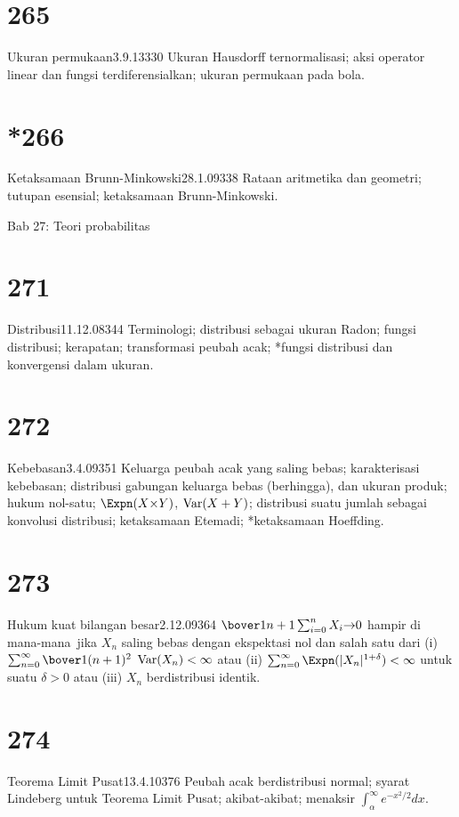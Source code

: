 \section{265}{Ukuran permukaan}{3.9.13}{330}{}
{Ukuran Hausdorff ternormalisasi; aksi operator linear dan
fungsi terdiferensialkan; ukuran permukaan pada bola.}

\section{*266}{Ketaksamaan Brunn-Minkowski}{28.1.09}{338}{}
{Rataan aritmetika dan geometri; tutupan esensial; ketaksamaan
Brunn-Minkowski.}


 Bab 27:  Teori probabilitas


\section{271}{Distribusi}{11.12.08}{344}{}
{Terminologi; distribusi sebagai ukuran Radon; fungsi distribusi;
kerapatan; transformasi peubah acak; *fungsi distribusi dan konvergensi
dalam ukuran.}

\section{272}{Kebebasan}{3.4.09}{351}{}
{Keluarga peubah acak yang saling bebas; karakterisasi
kebebasan; distribusi gabungan keluarga bebas (berhingga), dan
ukuran produk; hukum nol-satu; $\Expn(X{\times}Y)$, $\mathop{\text{Var}}(X+Y)$;
distribusi suatu jumlah sebagai konvolusi distribusi; ketaksamaan
Etemadi; *ketaksamaan Hoeffding.}

\section{273}{Hukum kuat bilangan besar}{2.12.09}{364}{}
{$\bover1{n+1}\sum_{i=0}^nX_i{\to}0$ hampir di mana-mana\ jika $X_n$
saling bebas dengan ekspektasi nol dan salah satu dari (i)
$\sum_{n=0}^{\infty}\bover1{(n+1)^2}$
\discretionary{}{}{}$\mathop{\text{Var}}(X_n)<\infty$ atau (ii)
$\sum_{n=0}^{\infty}\Expn(|X_n|^{1+\delta})<\infty$ untuk suatu $\delta>0$
atau (iii) $X_n$ berdistribusi identik.}

\section{274}{Teorema Limit Pusat}{13.4.10}{376}{}
{Peubah acak berdistribusi normal; syarat Lindeberg untuk
Teorema Limit Pusat; akibat-akibat; menaksir
$\int_{\alpha}^{\infty}e^{-x^2/2}dx$.}

